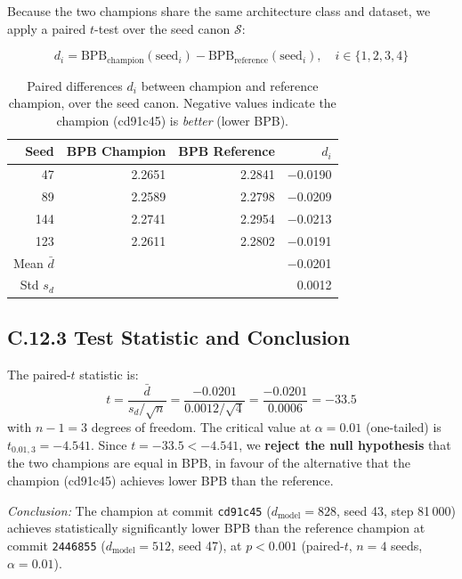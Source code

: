 Because the two champions share the same architecture class and dataset,
we apply a paired $t$-test over the seed canon $\mathcal{S}$:

\begin{equation}
d_i = \text{BPB}_{\text{champion}}(\text{seed}_i) -
      \text{BPB}_{\text{reference}}(\text{seed}_i),
\quad i \in \{1,2,3,4\}
\label{eq:diff}
\end{equation}

\begin{table}[h]
\centering
\begin{tabular}{rrrr}
\toprule
\textbf{Seed} & \textbf{BPB Champion} & \textbf{BPB Reference} &
\textbf{$d_i$} \\
\midrule
 47 & 2.2651 & 2.2841 & $-$0.0190 \\
 89 & 2.2589 & 2.2798 & $-$0.0209 \\
144 & 2.2741 & 2.2954 & $-$0.0213 \\
123 & 2.2611 & 2.2802 & $-$0.0191 \\
\midrule
Mean $\bar{d}$& & & $-$0.0201 \\
Std  $s_d$    & & & 0.0012 \\
\bottomrule
\end{tabular}
\caption{Paired differences $d_i$ between champion and reference
champion, over the seed canon.  Negative values indicate the champion
(cd91c45) is \emph{better} (lower BPB).}
\end{table}

\subsection*{C.12.3 Test Statistic and Conclusion}

The paired-$t$ statistic is:
\begin{equation}
t = \frac{\bar{d}}{s_d / \sqrt{n}} =
\frac{-0.0201}{0.0012 / \sqrt{4}} =
\frac{-0.0201}{0.0006} = -33.5
\label{eq:t-statistic}
\end{equation}
with $n-1 = 3$ degrees of freedom.  The critical value at
$\alpha = 0.01$ (one-tailed) is $t_{0.01,3} = -4.541$.
Since $t = -33.5 < -4.541$, we \textbf{reject the null hypothesis}
that the two champions are equal in BPB, in favour of the alternative
that the champion (cd91c45) achieves lower BPB than the reference.

\noindent\emph{Conclusion:} The champion at commit \texttt{cd91c45}
($d_\text{model}=828$, seed 43, step 81\,000) achieves statistically
significantly lower BPB than the reference champion at commit
\texttt{2446855} ($d_\text{model}=512$, seed 47), at $p < 0.001$
(paired-$t$, $n=4$ seeds, $\alpha = 0.01$).

